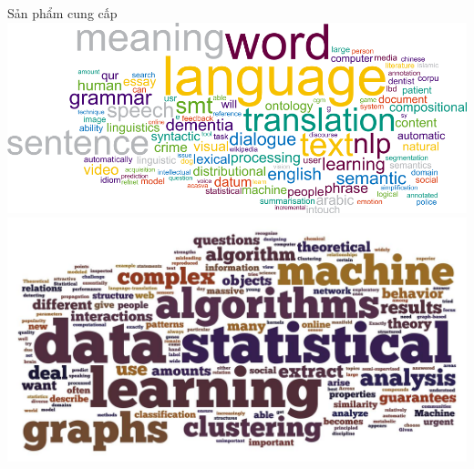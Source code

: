 \documentclass{beamer}
\begin{document}
\begin{frame}{Sản phẩm cung cấp}
\includegraphics[scale=0.1]{NPL.png}
\includegraphics[scale=0.1]{ML.jpg}
\end{frame}
\end{document}

